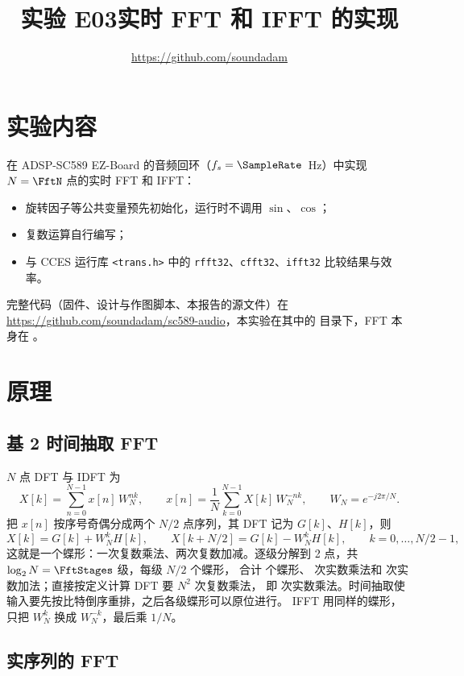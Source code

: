 \documentclass[zihao=-4, linespread=1.5, fontset=none]{ctexart}
\title{实验 E03\quad 实时 FFT 和 IFFT 的实现}
\author{\ReportAuthor\quad\url{https://github.com/soundadam}}
\date{}
\begin{document}
\maketitle

\section{实验内容}

在 ADSP-SC589 EZ-Board 的音频回环（$f_s=\SampleRate$~Hz）中实现 $N=\FftN$ 点的实时 FFT 和 IFFT：
\begin{itemize}
  \item 旋转因子等公共变量预先初始化，运行时不调用 $\sin$、$\cos$；
  \item 复数运算自行编写；
  \item 与 CCES 运行库 \texttt{<trans.h>} 中的 \texttt{rfft32}、\texttt{cfft32}、\texttt{ifft32} 比较结果与效率。
\end{itemize}

完整代码（固件、设计与作图脚本、本报告的源文件）在
\url{https://github.com/soundadam/sc589-audio}，本实验在其中的
 目录下，FFT 本身在 。

\section{原理}

\subsection{基 2 时间抽取 FFT}

$N$ 点 DFT 与 IDFT 为
\[
X[k]=\sum_{n=0}^{N-1}x[n]\,W_N^{nk},\qquad
x[n]=\frac1N\sum_{k=0}^{N-1}X[k]\,W_N^{-nk},\qquad W_N=e^{-j2\pi/N}.
\]
把 $x[n]$ 按序号奇偶分成两个 $N/2$ 点序列，其 DFT 记为 $G[k]$、$H[k]$，则
\[
X[k]=G[k]+W_N^kH[k],\qquad X[k+N/2]=G[k]-W_N^kH[k],\qquad k=0,\dots,N/2-1,
\]
这就是一个蝶形：一次复数乘法、两次复数加减。逐级分解到 2 点，共 $\log_2N=\FftStages$ 级，每级 $N/2$ 个蝶形，
合计 \Butterflies{} 个蝶形、\FftMuls{} 次实数乘法和 \FftAdds{} 次实数加法；直接按定义计算 DFT 要 $N^2$ 次复数乘法，
即 \DftMuls{} 次实数乘法。时间抽取使输入要先按比特倒序重排，之后各级蝶形可以原位进行。
IFFT 用同样的蝶形，只把 $W_N^k$ 换成 $W_N^{-k}$，最后乘 $1/N$。

\subsection{实序列的 FFT}
\end{document}
